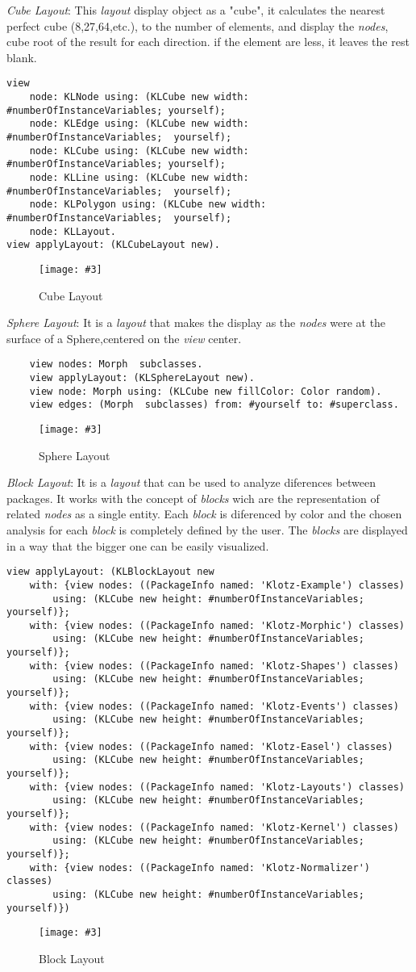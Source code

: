 \documentclass{sig-alternate}
\newcommand{\fig}[4]{
	\begin{figure}[#1]
		\centering
		\texttt{[image: \#3]}
		\caption{\label{fig:#3}#4}
	\end{figure}}
\begin{document}
\emph{Cube Layout}: This \emph{layout} display object as a "cube",
it calculates the nearest perfect cube (8,27,64,etc.), to the
number of elements, and display the \emph{nodes}, cube root 
of the result for each direction. if the element are less,
it leaves the rest blank.
\begin{lstlisting}
view 
	node: KLNode using: (KLCube new width:  #numberOfInstanceVariables; yourself);
	node: KLEdge using: (KLCube new width:  #numberOfInstanceVariables;  yourself);
	node: KLCube using: (KLCube new width:  #numberOfInstanceVariables; yourself);
	node: KLLine using: (KLCube new width:  #numberOfInstanceVariables;  yourself);
	node: KLPolygon using: (KLCube new width:  #numberOfInstanceVariables;  yourself);
	node: KLLayout.
view applyLayout: (KLCubeLayout new). 
\end{lstlisting}
\fig{}{0.6}{figure7.png}{Cube Layout}

\emph{Sphere Layout}: It is a \emph{layout} that makes the display
as the \emph{nodes} were at the surface of a Sphere,centered on the
\emph{view} center. 
\begin{lstlisting}
	view nodes: Morph  subclasses.
	view applyLayout: (KLSphereLayout new).
	view node: Morph using: (KLCube new fillColor: Color random).
	view edges: (Morph  subclasses) from: #yourself to: #superclass.
\end{lstlisting}
\fig{}{0.4}{figure8.png}{Sphere Layout}

\emph{Block Layout}: It is a \emph{layout} that can be used to 
analyze diferences between packages. It works with the concept
of \emph{blocks} wich are the representation of related \emph{nodes}
as a single entity. Each \emph{block} is diferenced by color and the
chosen analysis for each \emph{block} is completely defined by the
user. The \emph{blocks} are displayed in a way that the bigger one
can be easily visualized.
\begin{lstlisting}
view applyLayout: (KLBlockLayout new
	with: {view nodes: ((PackageInfo named: 'Klotz-Example') classes) 
		using: (KLCube new height: #numberOfInstanceVariables; yourself)};
	with: {view nodes: ((PackageInfo named: 'Klotz-Morphic') classes)
		using: (KLCube new height: #numberOfInstanceVariables; yourself)};
	with: {view nodes: ((PackageInfo named: 'Klotz-Shapes') classes)
		using: (KLCube new height: #numberOfInstanceVariables; yourself)};
	with: {view nodes: ((PackageInfo named: 'Klotz-Events') classes)
		using: (KLCube new height: #numberOfInstanceVariables; yourself)};		
	with: {view nodes: ((PackageInfo named: 'Klotz-Easel') classes)
		using: (KLCube new height: #numberOfInstanceVariables; yourself)};
	with: {view nodes: ((PackageInfo named: 'Klotz-Layouts') classes)
		using: (KLCube new height: #numberOfInstanceVariables; yourself)};
	with: {view nodes: ((PackageInfo named: 'Klotz-Kernel') classes)
		using: (KLCube new height: #numberOfInstanceVariables; yourself)};
	with: {view nodes: ((PackageInfo named: 'Klotz-Normalizer') classes)
		using: (KLCube new height: #numberOfInstanceVariables; yourself)})
\end{lstlisting}
\fig{}{0.4}{figure9.png}{Block Layout}
\end{document}
